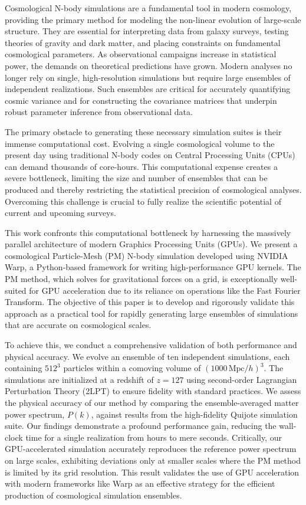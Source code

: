 \documentclass[]{article}
\begin{document}
Cosmological N-body simulations are a fundamental tool in modern cosmology, providing the primary method for modeling the non-linear evolution of large-scale structure. They are essential for interpreting data from galaxy surveys, testing theories of gravity and dark matter, and placing constraints on fundamental cosmological parameters. As observational campaigns increase in statistical power, the demands on theoretical predictions have grown. Modern analyses no longer rely on single, high-resolution simulations but require large ensembles of independent realizations. Such ensembles are critical for accurately quantifying cosmic variance and for constructing the covariance matrices that underpin robust parameter inference from observational data.

The primary obstacle to generating these necessary simulation suites is their immense computational cost. Evolving a single cosmological volume to the present day using traditional N-body codes on Central Processing Units (CPUs) can demand thousands of core-hours. This computational expense creates a severe bottleneck, limiting the size and number of ensembles that can be produced and thereby restricting the statistical precision of cosmological analyses. Overcoming this challenge is crucial to fully realize the scientific potential of current and upcoming surveys.

This work confronts this computational bottleneck by harnessing the massively parallel architecture of modern Graphics Processing Units (GPUs). We present a cosmological Particle-Mesh (PM) N-body simulation developed using NVIDIA Warp, a Python-based framework for writing high-performance GPU kernels. The PM method, which solves for gravitational forces on a grid, is exceptionally well-suited for GPU acceleration due to its reliance on operations like the Fast Fourier Transform. The objective of this paper is to develop and rigorously validate this approach as a practical tool for rapidly generating large ensembles of simulations that are accurate on cosmological scales.

To achieve this, we conduct a comprehensive validation of both performance and physical accuracy. We evolve an ensemble of ten independent simulations, each containing $512^3$ particles within a comoving volume of $(1000 \, \text{Mpc}/h)^3$. The simulations are initialized at a redshift of $z=127$ using second-order Lagrangian Perturbation Theory (2LPT) to ensure fidelity with standard practices. We assess the physical accuracy of our method by comparing the ensemble-averaged matter power spectrum, $P(k)$, against results from the high-fidelity Quijote simulation suite. Our findings demonstrate a profound performance gain, reducing the wall-clock time for a single realization from hours to mere seconds. Critically, our GPU-accelerated simulation accurately reproduces the reference power spectrum on large scales, exhibiting deviations only at smaller scales where the PM method is limited by its grid resolution. This result validates the use of GPU acceleration with modern frameworks like Warp as an effective strategy for the efficient production of cosmological simulation ensembles.
\end{document}
